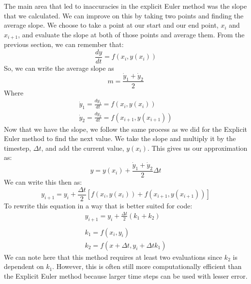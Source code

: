 \documentclass[12pt]{report}
\begin{document}
The main area that led to inaccuracies in the explicit Euler method was the slope that we calculated. We can improve on this by taking two points and finding the average slope. We choose to take a point at our start and our end point, $x_i$ and $x_{i+1}$, and evaluate the slope at both of those points and average them. From the previous section, we can remember that:
\begin{equation}
    \frac{dy}{dt}=f\left(x_i,y(x_i)\right)
\end{equation}
So, we can write the average slope as
\begin{equation}
    m=\frac{\dot{y}_1+\dot{y}_2}{2}
\end{equation}
Where
\begin{gather}
    \dot{y}_1=\frac{dy_1}{dt}=f\left(x_i,y(x_i)\right)\\
    \dot{y}_2=\frac{dy_2}{dt}=f\left(x_{i+1},y(x_{i+1})\right)
\end{gather}
Now that we have the slope, we follow the same process as we did for the Explicit Euler method to find the next value. We take the slope and multiply it by the timestep, $\Delta t$, and add the current value, $y(x_i)$. This gives us our approximation as:
\begin{equation}
    y=y(x_i)+\frac{\dot{y}_1+\dot{y}_2}{2}\Delta t
\end{equation}
We can write this then as:
\begin{equation}
    y_{i+1}=y_i+\frac{\Delta t}{2}\left[f(x_i,y(x_i))+f(x_{i+1},y(x_{i+1}))\right]
\end{equation}
To rewrite this equation in a way that is better suited for code:
\begin{gather}\label{eq:rk2}
    y_{i+1}=y_i+\frac{\Delta t}{2}(k_1+k_2)\\\\
    k_1=f(x_i,y_i)\\
    k_2=f(x+\Delta t, y_i+\Delta tk_1)
\end{gather}
We can note here that this method requires at least two evaluations since $k_2$ is dependent on $k_1$. However, this is often still more computationally efficient than the Explicit Euler method because larger time steps can be used with lesser error.
\end{document}
